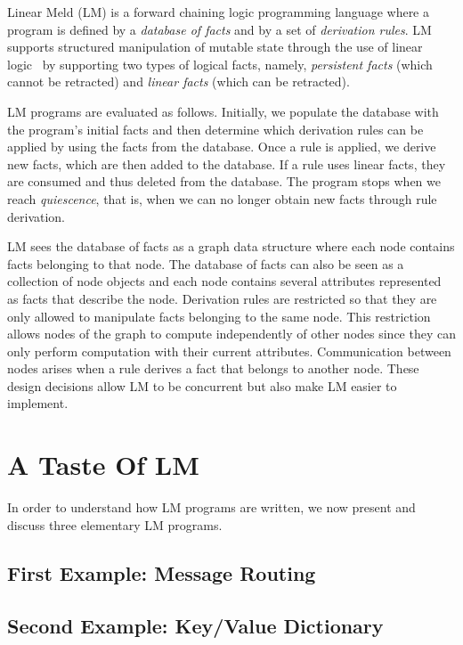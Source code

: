 
Linear Meld (LM) is a forward chaining logic programming language where a
program is defined by a \emph{database of facts} and by a set of
\emph{derivation rules}. LM supports structured manipulation of mutable state
through the use of linear logic~\cite{girard-87} by supporting two types of
logical facts, namely, \emph{persistent facts} (which cannot be retracted) and
\emph{linear facts} (which can be retracted).

LM programs are evaluated as follows. Initially, we populate the database with
the program's initial facts and then determine which derivation rules can be
applied by using the facts from the database. Once a rule is applied, we derive
new facts, which are then added to the database. If a rule uses linear facts,
they are consumed and thus deleted from the database. The program stops when we
reach \emph{quiescence}, that is, when we can no longer obtain new facts through
rule derivation.

LM sees the database of facts as a graph data structure where each node contains
facts belonging to that node. The database of facts can also be seen as a
collection of node objects and each node contains several attributes represented
as facts that describe the node. Derivation rules are restricted so that they
are only allowed to manipulate facts belonging to the same node. This
restriction allows nodes of the graph to compute independently of other nodes
since they can only perform computation with their current attributes.
Communication between nodes arises when a rule derives a fact that belongs to
another node. These design decisions allow LM to be concurrent but also make LM
easier to implement.

\section{A Taste Of LM}

In order to understand how LM programs are written, we now present and discuss
three elementary LM programs.

\subsection{First Example: Message Routing}\label{section:language:message}


\subsection{Second Example: Key/Value Dictionary}\label{sec:language:key_value}


